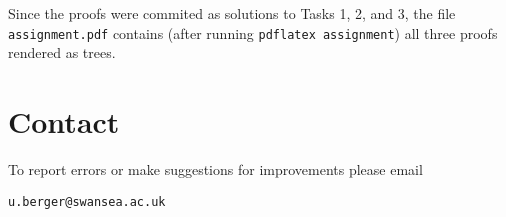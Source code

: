 \documentclass[12pt]{article}
\begin{document}
Since the proofs were commited as solutions to Tasks 1, 2, and 3, the file
\verb|assignment.pdf| contains (after running \verb|pdflatex assignment|)
all three proofs rendered as trees.



\section{Contact}
\label{sec-contact}

To report errors or make suggestions for improvements please email
\begin{verbatim}
u.berger@swansea.ac.uk 
\end{verbatim}
\end{document}
